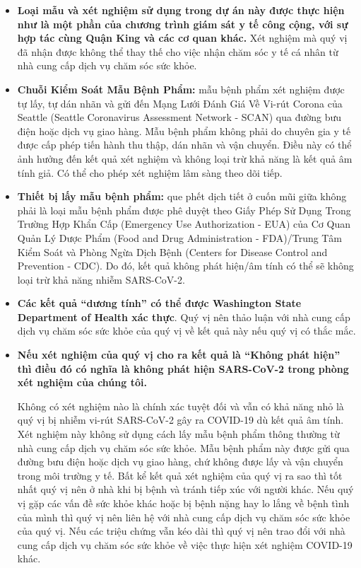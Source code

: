 \documentclass[10pt]{article}
\begin{document}
\begin{itemize}
\item

  \textbf{Loại mẫu và xét nghiệm sử dụng trong dự án này được thực hiện như là
  một phần của chương trình giám sát y tế công cộng, với sự hợp tác cùng Quận
  King và các cơ quan khác.} Xét nghiệm mà quý vị đã nhận được không thể thay
  thế cho việc nhận chăm sóc y tế cá nhân từ nhà cung cấp dịch vụ chăm sóc sức
  khỏe.

\item

  \textbf{Chuỗi Kiểm Soát Mẫu Bệnh Phẩm:} mẫu bệnh phẩm xét nghiệm được tự lấy,
  tự dán nhãn và gửi đến Mạng Lưới Đánh Giá Về Vi-rút Corona của Seattle
  (Seattle Coronavirus Assessment Network - SCAN) qua đường bưu điện hoặc dịch
  vụ giao hàng. Mẫu bệnh phẩm không phải do chuyên gia y tế được cấp phép tiến
  hành thu thập, dán nhãn và vận chuyển. Điều này có thể ảnh hưởng đến kết quả
  xét nghiệm và không loại trừ khả năng là kết quả âm tính giả. Có thể cho phép
  xét nghiệm lâm sàng theo dõi tiếp.

\item

  \textbf{Thiết bị lấy mẫu bệnh phẩm:} que phết dịch tiết ở cuốn mũi giữa không
  phải là loại mẫu bệnh phẩm được phê duyệt theo Giấy Phép Sử Dụng Trong Trường
  Hợp Khẩn Cấp (Emergency Use Authorization - EUA) của Cơ Quan Quản Lý Dược Phẩm
  (Food and Drug Administration - FDA)/Trung Tâm Kiểm Soát và Phòng Ngừa Dịch
  Bệnh (Centers for Disease Control and Prevention - CDC). Do đó, kết quả không
  phát hiện/âm tính có thể sẽ không loại trừ khả năng nhiễm SARS-CoV-2.

\item

  \textbf{Các kết quả ``dương tính'' có thể được Washington State Department of
  Health xác thực}. Quý vị nên thảo luận với nhà cung cấp dịch vụ chăm sóc sức
  khỏe của quý vị về kết quả này nếu quý vị có thắc mắc.

\item{
  \textbf{Nếu xét nghiệm của quý vị cho ra kết quả là ``Không phát hiện'' thì
  điều đó có nghĩa là không phát hiện SARS-CoV-2 trong phòng xét nghiệm của
  chúng tôi.}

  Không có xét nghiệm nào là chính xác tuyệt đối và vẫn có khả năng nhỏ là quý
  vị bị nhiễm vi-rút SARS-CoV-2 gây ra COVID-19 dù kết quả âm tính. Xét nghiệm
  này không sử dụng cách lấy mẫu bệnh phẩm thông thường từ nhà cung cấp dịch vụ
  chăm sóc sức khỏe. Mẫu bệnh phẩm này được gửi qua đường bưu điện hoặc dịch vụ
  giao hàng, chứ không được lấy và vận chuyển trong môi trường y tế. Bất kể kết
  quả xét nghiệm của quý vị ra sao thì tốt nhất quý vị nên ở nhà khi bị bệnh và
  tránh tiếp xúc với người khác. Nếu quý vị gặp các vấn đề sức khỏe khác hoặc bị
  bệnh nặng hay lo lắng về bệnh tình của mình thì quý vị nên liên hệ với nhà
  cung cấp dịch vụ chăm sóc sức khỏe của quý vị. Nếu các triệu chứng vẫn kéo dài
  thì quý vị nên trao đổi với nhà cung cấp dịch vụ chăm sóc sức khỏe về việc
  thực hiện xét nghiệm COVID-19 khác.
}


\end{itemize}
\end{document}
